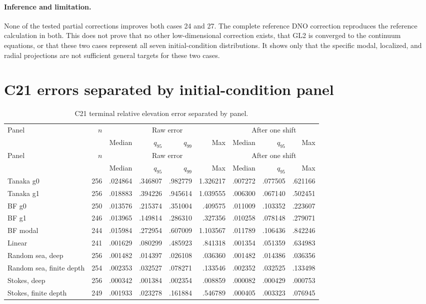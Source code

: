 \documentclass[11pt]{article}
\begin{document}
\paragraph{Inference and limitation.}
None of the tested partial corrections improves both cases 24 and 27.  The
complete reference DNO correction reproduces the reference calculation in
both.  This does not prove that no other low-dimensional correction exists,
that GL2 is converged to the continuum equations, or that these two cases
represent all seven initial-condition distributions.  It shows only that the
specific modal, localized, and radial projections are not sufficient general
targets for these two cases.

\FloatBarrier

\section{C21 errors separated by initial-condition panel}

\begingroup
\setlength{\tabcolsep}{4pt}
\begin{longtable}{lrrrrrrrr}
\caption{C21 terminal relative elevation error separated by panel.}
\label{tab:family-errors}\\
\toprule
Panel & $n$ & \multicolumn{4}{c}{Raw error} & \multicolumn{3}{c}{After one shift} \\
& & Median & $q_{95}$ & $q_{99}$ & Max & Median & $q_{95}$ & Max \\
\midrule
\endfirsthead
\toprule
Panel & $n$ & \multicolumn{4}{c}{Raw error} & \multicolumn{3}{c}{After one shift} \\
& & Median & $q_{95}$ & $q_{99}$ & Max & Median & $q_{95}$ & Max \\
\midrule
\endhead
Tanaka g0 & 256 & .024864 & .346807 & .982779 & 1.326217 & .007272 & .077505 & .621166 \\
Tanaka g1 & 256 & .018883 & .394226 & .945614 & 1.039555 & .006300 & .067140 & .502451 \\
BF g0 & 250 & .013576 & .215374 & .351004 & .409575 & .011009 & .103352 & .223607 \\
BF g1 & 246 & .013965 & .149814 & .286310 & .327356 & .010258 & .078148 & .279071 \\
BF modal & 244 & .015984 & .272954 & .607009 & 1.103567 & .011789 & .106436 & .842246 \\
Linear & 241 & .001629 & .080299 & .485923 & .841318 & .001354 & .051359 & .634983 \\
Random sea, deep & 256 & .001482 & .014397 & .026108 & .036360 & .001482 & .014386 & .036356 \\
Random sea, finite depth & 254 & .002353 & .032527 & .078271 & .133546 & .002352 & .032525 & .133498 \\
Stokes, deep & 256 & .000342 & .001384 & .002354 & .008859 & .000082 & .000429 & .000753 \\
Stokes, finite depth & 249 & .001933 & .023278 & .161884 & .546789 & .000405 & .003323 & .076945 \\
\bottomrule
\end{longtable}
\endgroup
\end{document}
